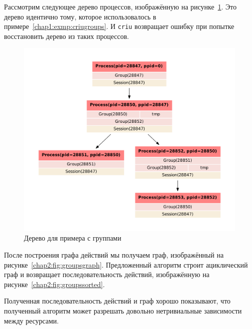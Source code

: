 Рассмотрим следующее дерево процессов, изображённую на рисунке~\ref{chap2:fig:groupspstree}. Это дерево идентично тому, которое использовалось в примере~\ref{chap1:exmp:criugroups}. И \texttt{criu} возвращает ошибку при попытке восстановить дерево из таких процессов. 


\begin{figure}[ht!]
	\centering
	\includegraphics[scale=0.4]{fig/examplePstree.pdf}
\caption{Дерево для примера с группами}
\label{chap2:fig:groupspstree}
\end{figure}

После построения графа действий мы получаем граф, изображённый на рисунке~\ref{chap2:fig:groupsgraph}. Предложенный алгоритм строит ациклический граф и возвращает последовательность действий, изображённую на рисунке~\ref{chap2:fig:groupssorted}.



Полученная последовательность действий и граф хорошо показывают, что полученный алгоритм может разрешать довольно нетривиальные зависимости между ресурсами.

